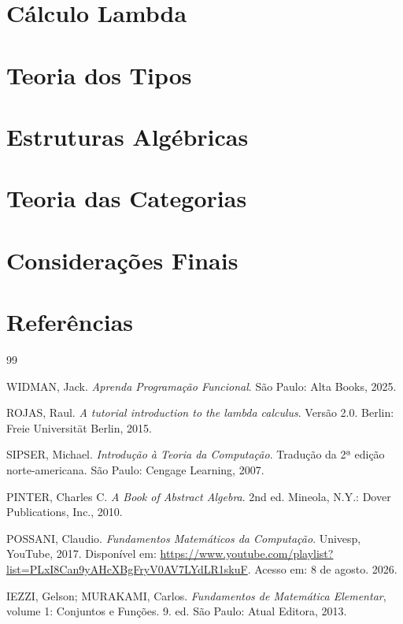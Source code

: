\documentclass[a4paper,12pt]{article}
\begin{document}
\section{Cálculo Lambda}

\section{Teoria dos Tipos}

\section{Estruturas Algébricas}

\section{Teoria das Categorias}

\section{Considerações Finais}

\newpage
\section{Referências}


\begin{thebibliography}{99}

WIDMAN, Jack. \textit{Aprenda Programação Funcional}. São Paulo: Alta Books, 2025.


ROJAS, Raul. \textit{A tutorial introduction to the lambda calculus}. Versão 2.0. Berlin: Freie Universität Berlin, 2015.

SIPSER, Michael. \textit{Introdução à Teoria da Computação}. Tradução da 2ª edição norte-americana. São Paulo: Cengage Learning, 2007.

PINTER, Charles C. \textit{A Book of Abstract Algebra}. 2nd ed. Mineola, N.Y.: Dover Publications, Inc., 2010.

POSSANI, Claudio. \textit{Fundamentos Matemáticos da Computação}. Univesp, YouTube, 2017. Disponível em: \url{https://www.youtube.com/playlist?list=PLxI8Can9yAHcXBgFryV0AV7LYdLR1skuF}. Acesso em: 8 de agosto. 2026.

IEZZI, Gelson; MURAKAMI, Carlos. \textit{Fundamentos de Matemática Elementar}, volume 1: Conjuntos e Funções. 9. ed. São Paulo: Atual Editora, 2013.

\end{thebibliography}
\end{document}
